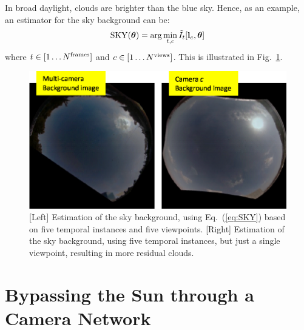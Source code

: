 \documentclass[runningheads]{llncs}
\begin{document}
In broad daylight, clouds are brighter than the blue sky. Hence, as an example, an estimator for the sky background can be:
\begin{equation}
 {\rm SKY}({\bm \theta})= \arg\min_{t,c} \tilde I_t[{\bf l}_c,{\bm \theta}]
 \label{eq:SKY}
\end{equation}
where $t\in[1\ldots N^{\rm frames}]$ and $c\in[1\ldots N^{\rm views}]$.
This is illustrated in Fig.~\ref{fig:sky}.
\begin{figure}[t!]
\begin{center}
   \includegraphics[width=0.5\linewidth]{figures/Background.eps}
\end{center}
   \vspace{-0.6cm}
   \caption{[Left] Estimation of the sky background, using Eq.~(\ref{eq:SKY}) based on five temporal
   instances and five viewpoints. [Right] Estimation of the sky background, using five temporal
   instances, but just a single viewpoint, resulting in more residual clouds.}
\label{fig:sky}
\end{figure}


\section{Bypassing the Sun through a Camera Network}
\label{sec:mutiSun}
\end{document}
